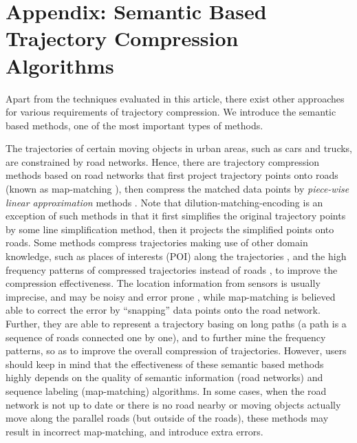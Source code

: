 \section*{{Appendix: Semantic Based Trajectory Compression Algorithms}}
{Apart from the techniques evaluated in this article, there exist other approaches for various requirements of trajectory compression. We introduce the semantic based methods, one of the most important types of methods.}

{The trajectories of certain moving objects in urban areas, such as cars and trucks, are constrained by road networks. Hence, there are trajectory compression methods based on road networks \cite{Chen:Trajectory, Popa:Spatio,Civilis:Techniques,Hung:Clustering, Kellaris:Map, Song:PRESS, Han:Compress, Cao:Road, Li:Uncertain} that first project trajectory points onto roads (known as map-matching \cite{Quddus:MapMatching}), then compress the matched data points by \emph{piece-wise linear approximation} methods \cite{Elmeleegy:Stream, Xie:Stream,Luo:Streaming,ORourke:Fitting}. 
Note that  dilution-matching-encoding \cite{Gotsman:Compaction} is an exception of such methods in that it first simplifies the original trajectory points by some line simplification method, then it projects the simplified points onto roads.}
%
{Some methods \cite{Schmid:Semantic, Richter:Semantic} compress trajectories making use of other domain knowledge, such as places of interests (POI) along the trajectories \cite{Richter:Semantic}, and the high frequency patterns of compressed trajectories instead of roads \cite{Gotsman:Compaction, Song:PRESS, Han:Compress,Koide:CiNCT}, to improve the compression effectiveness.}
%
{The location information from sensors is usually imprecise, and may be noisy and error prone \cite{Cao:Road}, while map-matching is believed able to correct the error by ``snapping'' data points onto the road network. Further, they are able to represent a trajectory basing on long paths (a path is a sequence of roads connected one by one), and to further mine the frequency patterns, so as to improve the overall compression of trajectories.}
%
{However, users should keep in mind that the effectiveness of these semantic based methods highly depends on the quality of semantic information (\eg road networks) and sequence labeling (\eg map-matching) algorithms. In some cases, \eg when the road network is not up to date or there is no road nearby or moving objects actually move along the parallel roads (but outside of the roads), these methods may result in incorrect map-matching, and introduce extra errors.}

